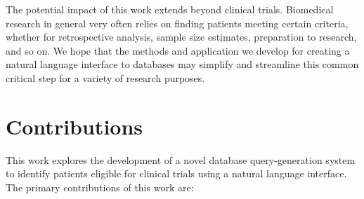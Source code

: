 \documentclass[../main.tex]{subfiles}
\begin{document}
The potential impact of this work extends beyond clinical trials. Biomedical research in general very often relies on finding patients meeting certain criteria, whether for retrospective analysis, sample size estimates, preparation to research, and so on. We hope that the methods and application we develop for creating a natural language interface to databases may simplify and streamline this common critical step for a variety of research purposes.

\section{Contributions}

This work explores the development of a novel database query-generation system to identify patients eligible for clinical trials using a natural language interface. The primary contributions of this work are:
\end{document}
